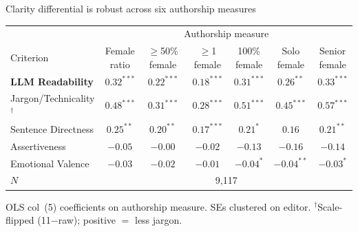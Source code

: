 \documentclass[aspectratio=169,11pt]{beamer}
\begin{document}
\begin{frame}{Clarity differential is robust across six authorship measures}
    \vfill
    \begin{center}
    {\small
    \begin{tabular}{lcccccc}
        \toprule
        & \multicolumn{6}{c}{Authorship measure} \\
        \cmidrule(lr){2-7}
        Criterion
            & \shortstack[c]{Female\\ratio}
            & \shortstack[c]{$\geq$50\%\\female}
            & \shortstack[c]{$\geq$1\\female}
            & \shortstack[c]{100\%\\female}
            & \shortstack[c]{Solo\\female}
            & \shortstack[c]{Senior\\female} \\
        \midrule
        \textbf{LLM Readability}          & $0.32^{***}$ & $0.22^{***}$ & $0.18^{***}$ & $0.31^{***}$ & $0.26^{**}$  & $0.33^{***}$ \\
        Jargon/Technicality$^{\dagger}$   & $0.48^{***}$ & $0.31^{***}$ & $0.28^{***}$ & $0.51^{***}$ & $0.45^{***}$ & $0.57^{***}$ \\
        Sentence Directness               & $0.25^{**}$  & $0.20^{**}$  & $0.17^{***}$ & $0.21^{*}$   & $0.16$       & $0.21^{**}$  \\
        \midrule
        Assertiveness                     & $-0.05$      & $-0.00$      & $-0.02$      & $-0.13$      & $-0.16$      & $-0.14$      \\
        Emotional Valence                 & $-0.03$      & $-0.02$      & $-0.01$      & $-0.04^{*}$  & $-0.04^{**}$ & $-0.03^{*}$  \\
        \midrule
        $N$                               & \multicolumn{6}{c}{9,117} \\
        \bottomrule
    \end{tabular}
    }
    \end{center}
    \vspace{0.2cm}
    \begin{center}
        {\small\color{WarmGray}
        OLS col~(5) coefficients on authorship measure. SEs clustered on editor.
        $^{\dagger}$Scale-flipped (11$-$raw); positive $=$ less jargon.}
    \end{center}
    \vfill
\end{frame}
\end{document}
